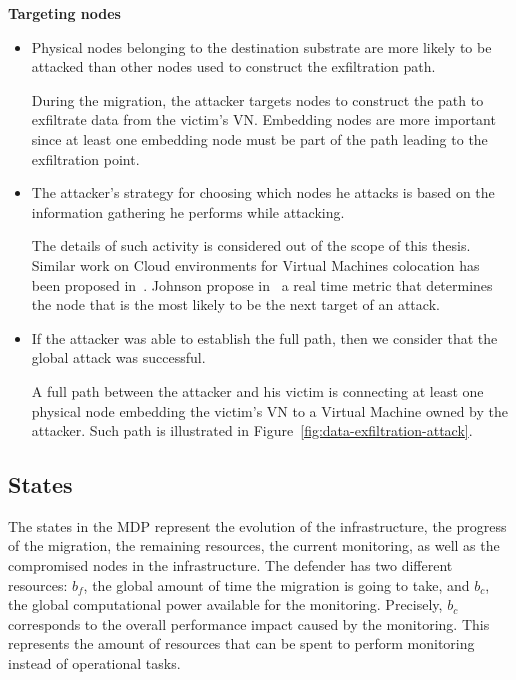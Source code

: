 \textbf{Targeting nodes}
\begin{itemize}
    \item  Physical nodes belonging to the destination substrate are more likely to be attacked than other nodes used to construct the exfiltration path. 
    
    During the migration, the attacker targets nodes to construct the path to exfiltrate data from the victim's VN.
    Embedding nodes are more important since at least one embedding node must be part of the path leading to the exfiltration point.
    
    \item The attacker's strategy for choosing which nodes he attacks is based on the information gathering he performs while attacking. 
    
    The details of such activity is considered out of the scope of this thesis.
    Similar work on Cloud environments for Virtual Machines colocation has been proposed in~\cite{getoffmucloud-Ristenpart2009, incentivemtd-Zhang2012}.
    Johnson \etal propose in~\cite{mitigateAPT-johnson2013} a real time metric that determines the node that is the most likely to be the next target of an attack.
    
    \item
    If the attacker was able to establish the full path, then we consider that the global attack was successful.
    
    A full path between the attacker and his victim is connecting at least one physical node embedding the victim's VN to a Virtual Machine owned by the attacker. Such path is illustrated in Figure~\ref{fig:data-exfiltration-attack}.
\end{itemize}



\subsection{States}
\label{sec:stateset}
The states in the MDP represent the evolution of the infrastructure, \ie the progress of the migration, the remaining resources, the current monitoring, as well as the compromised nodes in the infrastructure.
The defender has two different resources: $b_f$, the global amount of time the migration is going to take, and $b_c$, the global computational power available for the monitoring.
Precisely, $b_c$ corresponds to the overall performance impact caused by the monitoring. %
This represents the amount of resources that can be spent to perform monitoring instead of operational tasks.

